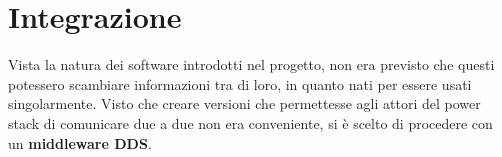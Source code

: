 \section{Integrazione}
Vista la natura dei software introdotti nel progetto, non era previsto che questi potessero scambiare informazioni tra di loro, in quanto nati per essere usati singolarmente. Visto che creare versioni che permettesse agli attori del power stack di comunicare due a due non era conveniente, si è scelto di procedere con un \textbf{middleware DDS}. %